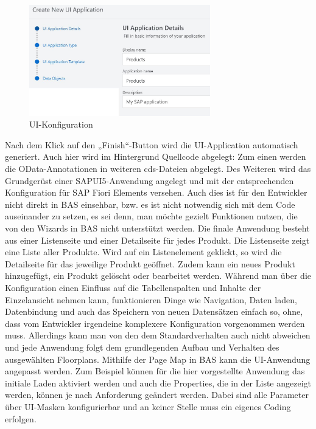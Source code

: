 \begin{figure}[htbp]
 \centering
 \includegraphics[width=0.7\textwidth]{Bilder/fiori_element/3_7_UI_Konfiguration.jpg}
 \caption{UI-Konfiguration}
\end{figure}

Nach dem Klick auf den „Finish“-Button wird die UI-Application automatisch generiert. Auch hier wird im Hintergrund Quellcode abgelegt: Zum einen werden die OData-Annotationen in weiteren cds-Dateien abgelegt. Des Weiteren wird das Grundgerüst einer SAPUI5-Anwendung angelegt und mit der entsprechenden Konfiguration für SAP Fiori Elements versehen. Auch dies ist für den Entwickler nicht direkt in BAS einsehbar, bzw. es ist nicht notwendig sich mit dem Code auseinander zu setzen, es sei denn, man möchte gezielt Funktionen nutzen, die von den Wizards in BAS nicht unterstützt werden.
Die finale Anwendung besteht aus einer Listenseite und einer Detailseite für jedes Produkt. Die Listenseite zeigt eine Liste aller Produkte. Wird auf ein Listenelement geklickt, so wird die Detailseite für das jeweilige Produkt geöffnet. Zudem kann ein neues Produkt hinzugefügt, ein Produkt gelöscht oder bearbeitet werden.  Während man über die Konfiguration einen Einfluss auf die Tabellenspalten und Inhalte der Einzelansicht nehmen kann, funktionieren Dinge wie Navigation, Daten laden, Datenbindung und auch das Speichern von neuen Datensätzen einfach so, ohne, dass vom Entwickler irgendeine komplexere Konfiguration vorgenommen werden muss. Allerdings kann man von den dem Standardverhalten auch nicht abweichen und jede Anwendung folgt dem grundlegenden Aufbau und Verhalten des ausgewählten Floorplans.
Mithilfe der Page Map in BAS kann die UI-Anwendung angepasst werden. Zum Beispiel können für die hier vorgestellte Anwendung das initiale Laden aktiviert werden und auch die Properties, die in der Liste angezeigt werden, können je nach Anforderung geändert werden. Dabei sind alle Parameter über UI-Masken konfigurierbar und an keiner Stelle muss ein eigenes Coding erfolgen.


